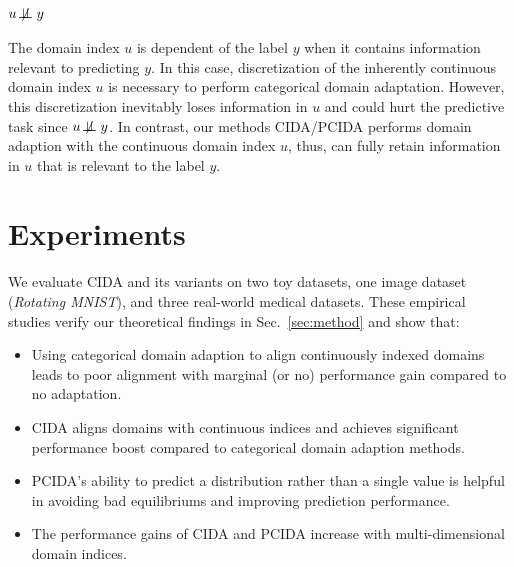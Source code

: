 \documentclass{article}
\newcommand{\secref}[1]{Sec.~\ref{#1}}
\newenvironment{Itemize}{\begin{itemize}\setlength{\itemsep}{0pt}\setlength{\topsep}{0pt}\setlength{\partopsep}{0pt}\setlength{\parskip}{0pt}}{\end{itemize}}
\begin{document}
\subsubsection{$u \not\!\perp\!\!\!\perp y$}
The domain index $u$ is dependent of the label $y$ when it contains information relevant to predicting $y$.
In this case, discretization of the inherently continuous domain index $u$ is necessary to perform categorical domain adaptation. However, this discretization inevitably loses information in $u$ and could hurt the predictive task since $u \not\!\perp\!\!\!\perp y$. In contrast, our methods CIDA/PCIDA performs domain adaption with the continuous domain index $u$, thus, can fully retain information in $u$ that is relevant to the label $y$.  \section{Experiments}\label{sec:experiment}
We evaluate CIDA and its variants on two toy datasets, one image dataset (\emph{Rotating MNIST}), and three real-world medical datasets. These empirical studies verify our theoretical findings in \secref{sec:method} and show that:
\begin{Itemize}
\item Using categorical domain adaption to align continuously indexed domains leads to poor alignment with marginal (or no) performance gain compared to no adaptation.\item CIDA aligns domains with continuous indices and achieves significant performance boost compared to categorical domain adaption methods.
\item PCIDA's ability to predict a distribution rather than a single value is helpful in avoiding bad equilibriums and improving prediction performance.
\item  The performance gains of CIDA and PCIDA increase with multi-dimensional domain indices.
\end{Itemize}
\end{document}
